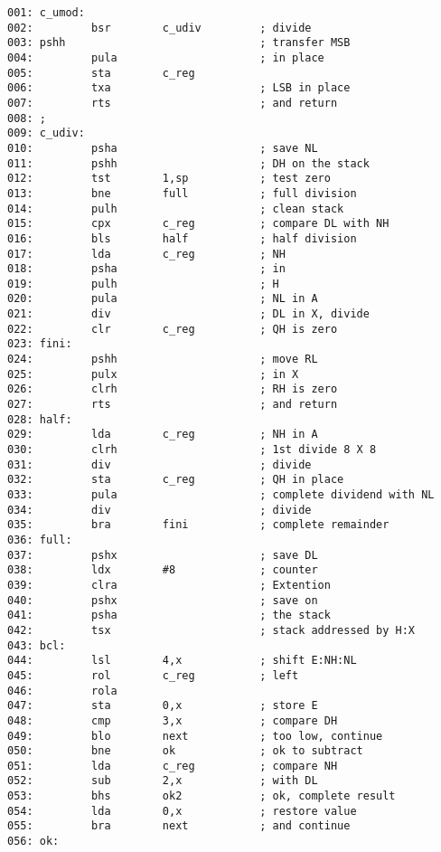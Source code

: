 \documentclass[letterpaper,10pt,titlepage]{article}
\begin{document}
\begin{verbatim}
001: c_umod:
002:         bsr        c_udiv         ; divide
003: pshh                              ; transfer MSB
004:         pula                      ; in place
005:         sta        c_reg
006:         txa                       ; LSB in place
007:         rts                       ; and return
008: ;
009: c_udiv:
010:         psha                      ; save NL
011:         pshh                      ; DH on the stack
012:         tst        1,sp           ; test zero
013:         bne        full           ; full division
014:         pulh                      ; clean stack
015:         cpx        c_reg          ; compare DL with NH
016:         bls        half           ; half division
017:         lda        c_reg          ; NH
018:         psha                      ; in
019:         pulh                      ; H
020:         pula                      ; NL in A
021:         div                       ; DL in X, divide
022:         clr        c_reg          ; QH is zero
023: fini:
024:         pshh                      ; move RL
025:         pulx                      ; in X
026:         clrh                      ; RH is zero
027:         rts                       ; and return
028: half:
029:         lda        c_reg          ; NH in A
030:         clrh                      ; 1st divide 8 X 8
031:         div                       ; divide
032:         sta        c_reg          ; QH in place
033:         pula                      ; complete dividend with NL
034:         div                       ; divide
035:         bra        fini           ; complete remainder
036: full:
037:         pshx                      ; save DL
038:         ldx        #8             ; counter
039:         clra                      ; Extention
040:         pshx                      ; save on
041:         psha                      ; the stack
042:         tsx                       ; stack addressed by H:X
043: bcl:
044:         lsl        4,x            ; shift E:NH:NL
045:         rol        c_reg          ; left
046:         rola
047:         sta        0,x            ; store E
048:         cmp        3,x            ; compare DH
049:         blo        next           ; too low, continue
050:         bne        ok             ; ok to subtract
051:         lda        c_reg          ; compare NH
052:         sub        2,x            ; with DL
053:         bhs        ok2            ; ok, complete result
054:         lda        0,x            ; restore value
055:         bra        next           ; and continue
056: ok:

\end{verbatim}
\end{document}
